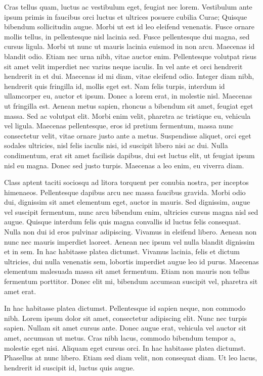 \documentclass[letterpaper,12pt,twocolumn,landscape]{memoir}
\begin{document}
Cras tellus quam, luctus ac vestibulum eget, feugiat nec lorem. Vestibulum ante ipsum primis in faucibus orci luctus et ultrices posuere cubilia Curae; Quisque bibendum sollicitudin augue. Morbi ut est id leo eleifend venenatis. Fusce ornare mollis tellus, in pellentesque nisl lacinia sed. Fusce pellentesque dui magna, sed cursus ligula. Morbi ut nunc ut mauris lacinia euismod in non arcu. Maecenas id blandit odio. Etiam nec urna nibh, vitae auctor enim. Pellentesque volutpat risus sit amet velit imperdiet nec varius neque iaculis. In vel ante et orci hendrerit hendrerit in et dui. Maecenas id mi diam, vitae eleifend odio. Integer diam nibh, hendrerit quis fringilla id, mollis eget est. Nam felis turpis, interdum id ullamcorper eu, auctor et ipsum. Donec a lorem erat, in molestie nisl. Maecenas ut fringilla est.
Aenean metus sapien, rhoncus a bibendum sit amet, feugiat eget massa. Sed ac volutpat elit. Morbi enim velit, pharetra ac tristique eu, vehicula vel ligula. Maecenas pellentesque, eros id pretium fermentum, massa nunc consectetur velit, vitae ornare justo ante a metus. Suspendisse aliquet, orci eget sodales ultricies, nisl felis iaculis nisi, id suscipit libero nisi ac dui. Nulla condimentum, erat sit amet facilisis dapibus, dui est luctus elit, ut feugiat ipsum nisl eu magna. Donec sed justo turpis. Maecenas a leo enim, eu viverra diam.

Class aptent taciti sociosqu ad litora torquent per conubia nostra, per inceptos himenaeos. Pellentesque dapibus arcu nec massa faucibus gravida. Morbi odio dui, dignissim sit amet elementum eget, auctor in mauris. Sed dignissim, augue vel suscipit fermentum, nunc arcu bibendum enim, ultricies cursus magna nisl sed augue. Quisque interdum felis quis magna convallis id luctus felis consequat. Nulla non dui id eros pulvinar adipiscing. Vivamus in eleifend libero. Aenean non nunc nec mauris imperdiet laoreet. Aenean nec ipsum vel nulla blandit dignissim et in sem. In hac habitasse platea dictumst. Vivamus lacinia, felis et dictum ultricies, dui nulla venenatis sem, lobortis imperdiet augue leo id purus. Maecenas elementum malesuada massa sit amet fermentum. Etiam non mauris non tellus fermentum porttitor. Donec elit mi, bibendum accumsan suscipit vel, pharetra sit amet erat.

In hac habitasse platea dictumst. Pellentesque id sapien neque, non commodo nibh. Lorem ipsum dolor sit amet, consectetur adipiscing elit. Nunc nec turpis sapien. Nullam sit amet cursus ante. Donec augue erat, vehicula vel auctor sit amet, accumsan ut metus. Cras nibh lacus, commodo bibendum tempor a, molestie eget nisi. Aliquam eget cursus orci. In hac habitasse platea dictumst. Phasellus at nunc libero. Etiam sed diam velit, non consequat diam. Ut leo lacus, hendrerit id suscipit id, luctus quis augue.

\pend
\endnumbering
\end{document}
